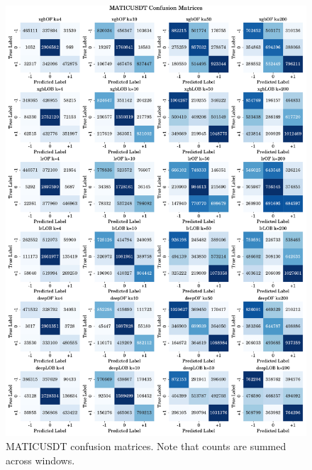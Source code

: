 \begin{figure}[htpb!]
    \centering
    \includegraphics[width=1.0\textwidth]{./images/MATICUSDT_confusion_matrices.pdf}
    \caption{MATICUSDT confusion matrices. Note that counts are summed across windows.}
    \label{MATICUSDT_cm}
\end{figure}

